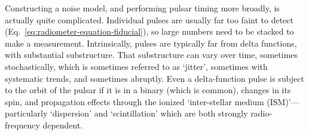 \documentclass[onecolumn,authoryear]{els-mrw}
\begin{document}

Constructing a noise model, and performing pulsar timing more broadly, is actually quite complicated.  Individual pulses are usually far too faint to detect (Eq.~\ref{eq:radiometer-equation-fiducial}), so large numbers need to be stacked to make a measurement.  Intrinsically, pulses are typically far from delta functions, with substantial substructure.  That substructure can vary over time, sometimes stochastically, which is sometimes referred to as `jitter', sometimes with systematic trends, and sometimes abruptly.  Even a delta-function pulse is subject to the orbit of the pulsar if it is in a binary (which is common), changes in its spin, and propagation effects through the ionized `inter-stellar medium (ISM)'---particularly `dispersion' and `scintillation' which are both strongly radio-frequency dependent.

\end{document}
